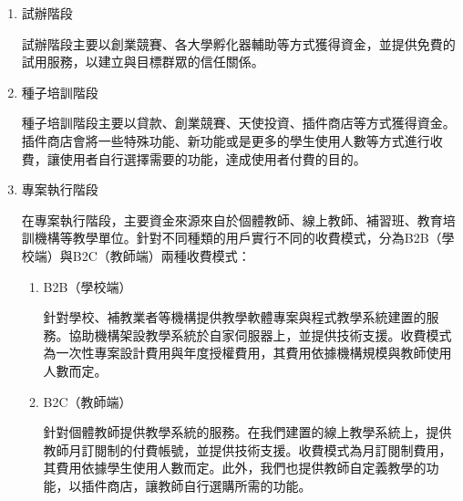 \label{sec:revenue}
\begin{enumerate}
  \setlength{\parindent}{2em}
  \item 試辦階段
  \par 試辦階段主要以創業競賽、各大學孵化器輔助等方式獲得資金，並提供免費的試用服務，以建立與目標群眾的信任關係。
  \item 種子培訓階段
  \par 種子培訓階段主要以貸款、創業競賽、天使投資、插件商店等方式獲得資金。插件商店會將一些特殊功能、新功能或是更多的學生使用人數等方式進行收費，讓使用者自行選擇需要的功能，達成使用者付費的目的。
  \item 專案執行階段
  \par 在專案執行階段，主要資金來源來自於個體教師、線上教師、補習班、教育培訓機構等教學單位。針對不同種類的用戶實行不同的收費模式，分為B2B（學校端）與B2C（教師端）兩種收費模式：
  \begin{enumerate}
    \setlength{\parindent}{2em}
    \item B2B（學校端）
    \par 針對學校、補教業者等機構提供教學軟體專案與程式教學系統建置的服務。協助機構架設教學系統於自家伺服器上，並提供技術支援。收費模式為一次性專案設計費用與年度授權費用，其費用依據機構規模與教師使用人數而定。
    \item B2C（教師端）
    \par 針對個體教師提供教學系統的服務。在我們建置的線上教學系統上，提供教師月訂閱制的付費帳號，並提供技術支援。收費模式為月訂閱制費用，其費用依據學生使用人數而定。此外，我們也提供教師自定義教學的功能，以插件商店，讓教師自行選購所需的功能。
  \end{enumerate}
\end{enumerate}

